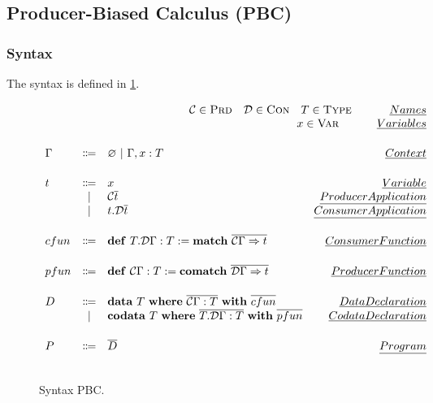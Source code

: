 \subsection{Producer-Biased Calculus (PBC)}

\subsubsection{Syntax}

The syntax is defined in \cref{fig:PBC:syntax}.

\begin{figure}[H]
    \setlength{\abovedisplayskip}{0pt}
    \setlength{\belowdisplayskip}{0pt}
    \setlength{\abovedisplayshortskip}{0pt}
    \setlength{\belowdisplayshortskip}{0pt}
  \[
  \begin{array}{lclr}
    \multicolumn{4}{r}{
      \mathcal{C} \in \textsc{Prd}
      \quad
      \mathcal{D} \in \textsc{Con}
      \quad
      T \in \textsc{Type}
      \mspace{60mu}
      \emph{Names}
    }
    \\
    \multicolumn{4}{r}{
      x \in \textsc{Var}
      \mspace{60mu}
      \emph{Variables}
    }
    \\[0.5cm]

    \Gamma
    & \Coloneqq
    & \varnothing\ |\ \Gamma, x : T
    & \emph{Context}
    \\[0.5cm]

    t
    & \Coloneqq
    & x
    & \emph{Variable}
    \\
    & | & \mathcal{C}\overline{t}
    & \emph{Producer Application}
    \\
    & | & t.\mathcal{D}\overline{t}
    & \emph{Consumer Application}
    \\[0.5cm]

    cfun
    & \Coloneqq
    & \define\
      T.\mathcal{D}\Gamma : T
      := \match\
         \overline{\mathcal{C}\Gamma \Rightarrow t}
    & \emph{Consumer Function}
    \\[0.5cm]

    pfun
    & \Coloneqq
    & \define\
      \mathcal{C}\Gamma : T
      := \comatch\
         \overline{\mathcal{D}\Gamma \Rightarrow t}
    & \emph{Producer Function}
    \\[0.5cm]

    D
    & \Coloneqq
    & \data\
      T\
      \where\
      \overline{\mathcal{C}\Gamma : T}\
      \with\
      \overline{cfun}
    & \emph{Data Declaration}
    \\
    & | & \codata\
          T\
          \where\
          \overline{T.\mathcal{D}\Gamma : T}\
          \with\
          \overline{pfun}
    & \emph{Codata Declaration}
    \\[0.5cm]

    P
    & \Coloneqq
    & \overline{D}
    & \emph{Program}
    \\[0.5cm]
  \end{array}
  \]
  \caption{Syntax PBC.}
  \label{fig:PBC:syntax}
\end{figure}

